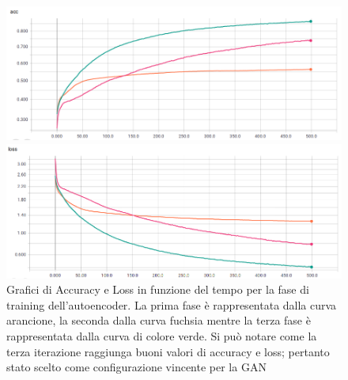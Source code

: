 \begin{figure}[p]
    \centering
    \begin{minipage}[t]{0.7\linewidth}
    	\includegraphics[width=\linewidth]{figures/autoenc.png}
    \end{minipage}\hfill
    \begin{minipage}[b]{0.7\linewidth}
    	\includegraphics[width=\linewidth]{figures/autoenc2.png}
    \end{minipage}
    \caption{Grafici di Accuracy e Loss in funzione del tempo per la fase di training dell'autoencoder. La prima fase è rappresentata dalla curva arancione, la seconda dalla curva fuchsia mentre la terza fase è rappresentata dalla curva di colore verde. Si può notare come la terza iterazione raggiunga buoni valori di accuracy e loss; pertanto stato scelto come configurazione vincente per la GAN \label{fig:aut1}}
\end{figure}

